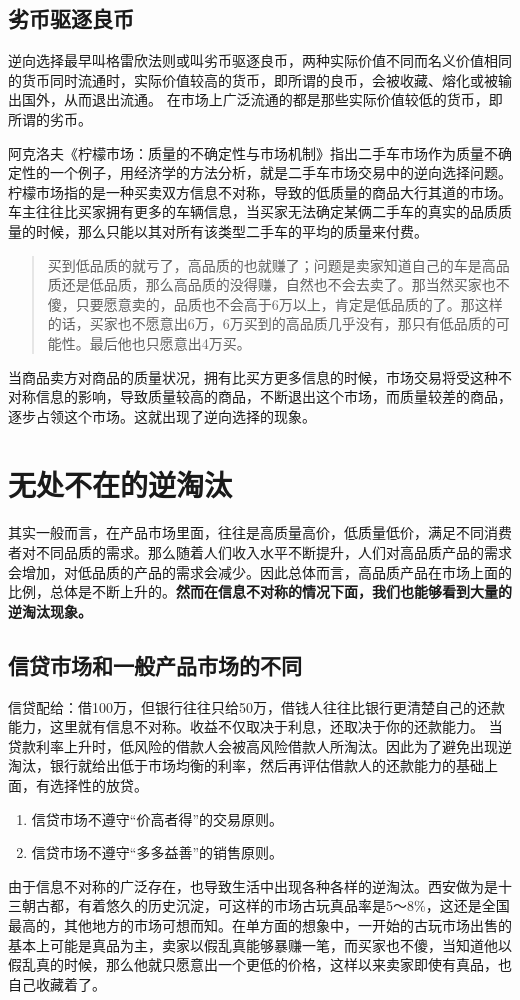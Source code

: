 \documentclass[12pt, a4paper]{article}
\begin{document}
\begin{CJK*}{UTF8}{gbsn}
       \subsection{劣币驱逐良币}
       逆向选择最早叫格雷欣法则或叫劣币驱逐良币，两种实际价值不同而名义价值相同的货币同时流通时，实际价值较高的货币，即所谓的良币，会被收藏、熔化或被输出国外，从而退出流通。
       在市场上广泛流通的都是那些实际价值较低的货币，即所谓的劣币。 \par
       阿克洛夫《柠檬市场：质量的不确定性与市场机制》指出二手车市场作为质量不确定性的一个例子，用经济学的方法分析，就是二手车市场交易中的逆向选择问题。
       柠檬市场指的是一种买卖双方信息不对称，导致的低质量的商品大行其道的市场。车主往往比买家拥有更多的车辆信息，当买家无法确定某俩二手车的真实的品质质量的时候，那么只能以其对所有该类型二手车的平均的质量来付费。
       \begin{quote}
        {\small 买到低品质的就亏了，高品质的也就赚了；问题是卖家知道自己的车是高品质还是低品质，那么高品质的没得赚，自然也不会去卖了。那当然买家也不傻，只要愿意卖的，品质也不会高于6万以上，肯定是低品质的了。那这样的话，买家也不愿意出6万，6万买到的高品质几乎没有，那只有低品质的可能性。最后他也只愿意出4万买。}
        \end{quote}
        当商品卖方对商品的质量状况，拥有比买方更多信息的时候，市场交易将受这种不对称信息的影响，导致质量较高的商品，不断退出这个市场，而质量较差的商品，逐步占领这个市场。这就出现了逆向选择的现象。

        \clearpage
        \section{无处不在的逆淘汰}
        其实一般而言，在产品市场里面，往往是高质量高价，低质量低价，满足不同消费者对不同品质的需求。那么随着人们收入水平不断提升，人们对高品质产品的需求会增加，对低品质的产品的需求会减少。因此总体而言，高品质产品在市场上面的比例，总体是不断上升的。\textbf{然而在信息不对称的情况下面，我们也能够看到大量的逆淘汰现象。}
        \subsection{信贷市场和一般产品市场的不同}
        信贷配给：借100万，但银行往往只给50万，借钱人往往比银行更清楚自己的还款能力，这里就有信息不对称。收益不仅取决于利息，还取决于你的还款能力。
        当贷款利率上升时，低风险的借款人会被高风险借款人所淘汰。因此为了避免出现逆淘汰，银行就给出低于市场均衡的利率，然后再评估借款人的还款能力的基础上面，有选择性的放贷。
        \begin{enumerate}
            \item 信贷市场不遵守“价高者得”的交易原则。
            \item 信贷市场不遵守“多多益善”的销售原则。
        \end{enumerate}
        由于信息不对称的广泛存在，也导致生活中出现各种各样的逆淘汰。西安做为是十三朝古都，有着悠久的历史沉淀，可这样的市场古玩真品率是5～8\%，这还是全国最高的，其他地方的市场可想而知。在单方面的想象中，一开始的古玩市场出售的基本上可能是真品为主，卖家以假乱真能够暴赚一笔，而买家也不傻，当知道他以假乱真的时候，那么他就只愿意出一个更低的价格，这样以来卖家即使有真品，也自己收藏着了。

    \end{CJK*}
\end{document}
